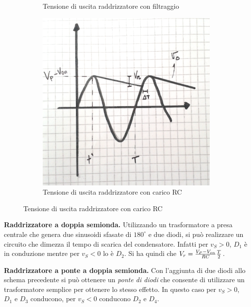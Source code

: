 \documentclass[a4paper,portrait,12pt]{article}
\theoremstyle{definition}
\begin{document}
\begin{figure}[H]
\begin{subfigure}{.5\textwidth}
\caption{Tensione di uscita raddrizzatore con filtraggio}
\label{fig:integratore}
\end{subfigure}
\begin{subfigure}{.5\textwidth}
\centering
\includegraphics[width=.5\linewidth]{img/uscitaraddRC.pdf}
\caption{Tensione di uscita raddrizzatore con carico RC}
\label{fig:integratore}
\end{subfigure}
\end{figure}

\textbf{Raddrizzatore a doppia semionda.} Utilizzando un trasformatore a presa centrale che genera due 
sinusoidi sfasate di $180^{\circ}$ e due diodi, si può realizzare un circuito che dimezza il tempo di 
scarica del condensatore. Infatti per $v_S > 0$, $D_1$ è in conduzione mentre per $v_S < 0$ lo è $D_2$. 
Si ha quindi che $V_r = {V_P - V_{on} \over RC}{T \over 2}$.
\bigskip

\textbf{Raddrizzatore a ponte a doppia semionda.} Con l'aggiunta di due diodi allo schema precedente si 
può ottenere un \textit{ponte di diodi} che consente di utilizzare un trasformatore semplice per ottenere
lo stesso effetto. In questo caso per $v_S>0$, $D_1$ e $D_3$ conducono, per $v_S<0$ conducono $D_2$ e $D_4$.
\bigskip
\end{document}
